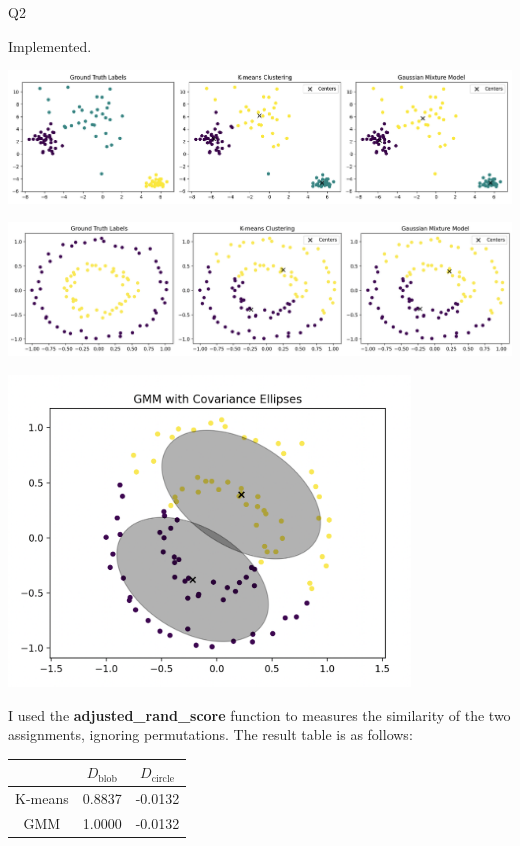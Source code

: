 \question Q2\droppoints

\begin{solution}
     Implemented.


    \centerline {
        \includegraphics[width=\textwidth]{img/blob_comparison}
    }


    \centerline {
        \includegraphics[width=\textwidth]{img/circle_comparison}
    }


    \centerline {
        \includegraphics[width=0.8\textwidth]{img/covariance_ellipses}
    }

     I used the \textbf{adjusted\_rand\_score} function to measures the similarity of the two assignments, ignoring permutations.
    The result table is as follows:

    \begin{center}
        \begin{tabular}{ c c c }
            \hline
            ${ }$   & $D_{\text{blob}}$ & $D_{\text{circle}}$ \\
            \hline
            K-means & 0.8837            & -0.0132             \\
            GMM     & 1.0000            & -0.0132             \\
            \hline
        \end{tabular}
    \end{center}


\end{solution}
